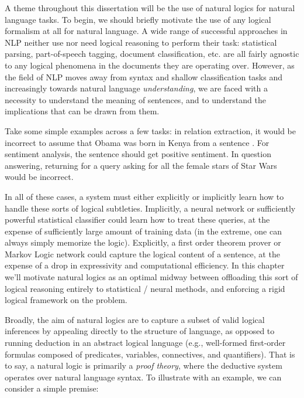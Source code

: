 A theme throughout this dissertation will be the use of natural
  logics for natural language tasks.
%
%
To begin, we should briefly motivate the use of any logical formalism at all
  for natural language. %
A wide range of successful approaches in NLP neither use nor need logical reasoning 
  to perform their task:
  statistical parsing, part-of-speech tagging, document classification, etc. are all
  fairly agnostic to any logical phenomena in the documents they are operating over.
However, as the field of NLP moves away from syntax and shallow classification tasks and
  increasingly towards natural language \textit{understanding}, we are faced with a
  necessity to understand the meaning of sentences, and to understand the implications that can
  be drawn from them.

Take some simple examples across a few tasks: in relation extraction, it would be
  incorrect to assume that Obama was born in Kenya from a sentence .
For sentiment analysis, the sentence  should get positive sentiment.
In question answering, returning  for a query asking for all the female
  stars of Star Wars would be incorrect.

In all of these cases, a system must either explicitly or implicitly learn how to handle these
  sorts of logical subtleties.
Implicitly, a neural network or sufficiently powerful statistical classifier could learn how
  to treat these queries, at the expense of sufficiently large amount of training data
  (in the extreme, one can always simply memorize the logic).
Explicitly, a first order theorem prover or Markov Logic network could capture the logical
  content of a sentence, at the expense of a drop in expressivity and computational
  efficiency.
In this chapter we'll motivate natural logics as an optimal midway between offloading this sort
  of logical reasoning entirely to statistical / neural methods, and enforcing a rigid
  logical framework on the problem.


%
%
Broadly, the aim of natural logics are to capture a subset of valid logical
  inferences by appealing directly to the structure of language,
  as opposed to running deduction in an abstract logical language (e.g., well-formed first-order formulas
  composed of predicates, variables, connectives, and quantifiers).
That is to say, a natural logic is primarily a \textit{proof theory}, where
  the deductive system operates over natural language syntax.
To illustrate with an example, we can consider a simple premise:

